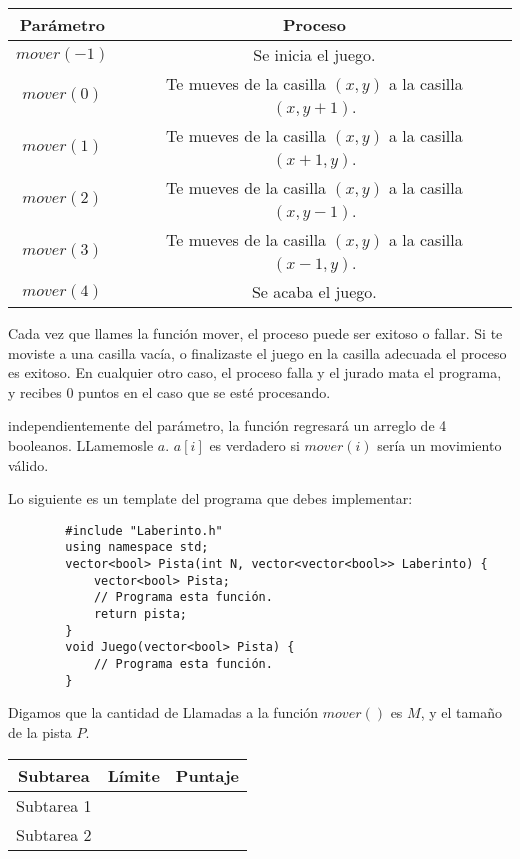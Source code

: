 \documentclass[12pt]{scrartcl}
\begin{document}
    \begin{center}
        \begin{tabular}{|c|c|}
            \hline
            {\bfseries Parámetro} & {\bfseries Proceso}\\
            \hline
             $mover(-1)$ & Se inicia el juego. \\
             \hline
             $mover(0)$ &  Te mueves de la casilla $(x, y)$ a la casilla $(x, y + 1)$. \\
             \hline
             $mover(1)$ & Te mueves de la casilla $(x, y)$ a la casilla $(x + 1, y)$.\\
             \hline
             $mover(2)$ & Te mueves de la casilla $(x, y)$ a la casilla $(x, y - 1)$.\\
             \hline
             $mover(3)$ & Te mueves de la casilla $(x, y)$ a la casilla $(x - 1, y)$.\\
             \hline
             $mover(4)$ & Se acaba el juego.\\
             \hline
        \end{tabular}
    \end{center}

    Cada vez que llames la función mover, el proceso puede ser exitoso o fallar.  Si te moviste a una casilla vacía, o finalizaste el juego en la casilla adecuada el proceso es exitoso. En cualquier otro caso, el proceso falla y el jurado mata el programa, y recibes 0 puntos en el caso que se esté procesando.
    
    
    independientemente del parámetro, la función regresará  un arreglo de 4 booleanos. LLamemosle $a$. $a[i]$ es verdadero si $mover(i)$ sería un movimiento válido. 
    
    Lo siguiente es un template del programa que debes implementar:
    
    \begin{verbatim}
        #include "Laberinto.h"
        using namespace std;
        vector<bool> Pista(int N, vector<vector<bool>> Laberinto) {
            vector<bool> Pista;
            // Programa esta función.
            return pista;
        }
        void Juego(vector<bool> Pista) {
            // Programa esta función.
        }
    \end{verbatim}


    Digamos que la cantidad de Llamadas a la función $mover()$ es $M$, y el tamaño de la pista $P$.
    
    \begin{center}
        \begin{tabular}{|c|c|c|}
            \hline
            Subtarea & Límite & Puntaje \\
            \hline
            Subtarea 1 &  & \\
            \hline
            Subtarea 2 &  & \\
            \hline
        \end{tabular}
    \end{center}
\end{document}
